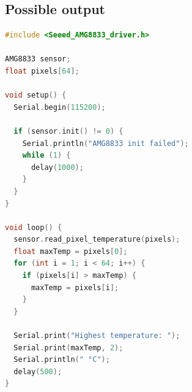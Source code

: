 \documentclass{article}
\begin{document}
\subsection*{Possible output}
\begin{lstlisting}[language=C++]
#include <Seeed_AMG8833_driver.h>

AMG8833 sensor;
float pixels[64];

void setup() {
  Serial.begin(115200);

  if (sensor.init() != 0) {
    Serial.println("AMG8833 init failed");
    while (1) {
      delay(1000);
    }
  }
}

void loop() {
  sensor.read_pixel_temperature(pixels);
  float maxTemp = pixels[0];
  for (int i = 1; i < 64; i++) {
    if (pixels[i] > maxTemp) {
      maxTemp = pixels[i];
    }
  }

  Serial.print("Highest temperature: ");
  Serial.print(maxTemp, 2);
  Serial.println(" °C");
  delay(500);
}
\end{lstlisting}
\end{document}
